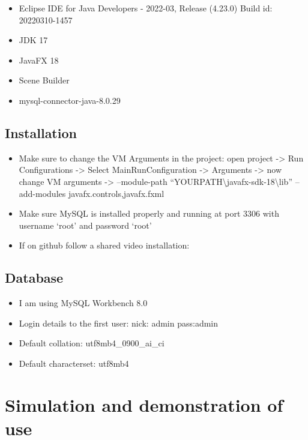 \documentclass[
]{report}
\providecommand{\tightlist}{%
  \setlength{\itemsep}{0pt}\setlength{\parskip}{0pt}}
\begin{document}
\begin{itemize}
\item
  Eclipse IDE for Java Developers - 2022-03, Release (4.23.0) Build id: 20220310-1457
\item
  JDK 17
\item
  JavaFX 18
\item
  Scene Builder
\item
  mysql-connector-java-8.0.29
\end{itemize}

\hypertarget{installation}{%
\section{Installation}\label{installation}}

\begin{itemize}
\item
  Make sure to change the VM Arguments in the project: open project -\textgreater{} Run Configurations -\textgreater{} Select MainRunConfiguration -\textgreater{} Arguments -\textgreater{} now change VM arguments -\textgreater{} --module-path ``YOURPATH\textbackslash javafx-sdk-18\textbackslash lib'' --add-modules javafx.controls,javafx.fxml
\item
  Make sure MySQL is installed properly and running at port 3306 with username `root' and password `root'
\item
  If on github follow a shared video installation:
\end{itemize}

\hypertarget{database}{%
\section{Database}\label{database}}

\begin{itemize}
\tightlist
\item
  I am using MySQL Workbench 8.0
\item
  Login details to the first user: nick: admin pass:admin
\item
  Default collation: utf8mb4\_0900\_ai\_ci
\item
  Default characterset: utf8mb4
\end{itemize}

\hypertarget{simulation-and-demonstration-of-use}{%
\chapter{Simulation and demonstration of use}\label{simulation-and-demonstration-of-use}}
\end{document}
